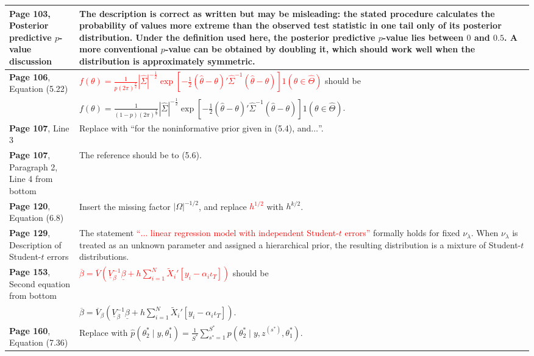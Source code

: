 \documentclass[10pt, a4paper]{article}
\newcommand{\red}[1]{\textcolor{red}{#1}}
\newcommand{\green}[1]{\textcolor{green!50!black}{#1}}
\begin{document}
\begin{longtable}{|R{.36\textwidth}|R{.58\textwidth}|}
	\textbf{Page 103}, Posterior predictive $p$-value discussion & The description is correct as written but may be misleading: the stated procedure calculates the probability of values more extreme than the observed test statistic in one tail only of its posterior distribution. Under the definition used here, the posterior predictive $p$-value lies between $0$ and $0.5$. A more conventional $p$-value can be obtained by doubling it, which should work well when the distribution is approximately symmetric. \\ \hline	
	\textbf{Page 106}, Equation (5.22) & \red{$\displaystyle f(\theta)=\frac{1}{p(2\pi)^{\frac{k}{2}}}|\widehat{\Sigma}|^{-\frac{1}{2}}\exp\left[-\frac{1}{2}(\widehat{\theta}-\theta)'\widehat{\Sigma}^{-1}(\widehat{\theta}-\theta)\right]1(\theta\in\widehat{\Theta})$} should be \\ 
	& \green{$\displaystyle f(\theta)=\frac{1}{(1-p)(2\pi)^{\frac{k}{2}}}|\widehat{\Sigma}|^{-\frac{1}{2}}\exp\left[-\frac{1}{2}(\widehat{\theta}-\theta)'\widehat{\Sigma}^{-1}(\widehat{\theta}-\theta)\right]1(\theta\in\widehat{\Theta})$}. \\ \hline	
	\textbf{Page 107}, Line 3 & Replace with \green{``for the noninformative prior given in (5.4), and$\ldots$''}. \\ \hline	
	\textbf{Page 107}, Paragraph 2, Line 4 from bottom & The reference should be to \green{(5.6)}. \\ \hline	
	\textbf{Page 120}, Equation (6.8) & Insert the missing factor \green{$|\Omega|^{-1/2}$}, and replace \red{$h^{1/2}$} with \green{$h^{k/2}$}. \\ \hline	
	\textbf{Page 129}, Description of Student-$t$ errors & The statement \red{``$\ldots$ linear regression model with independent Student-$t$ errors''} formally holds for fixed $\nu_\lambda$. When $\nu_\lambda$ is treated as an unknown parameter and assigned a hierarchical prior, the resulting distribution is a mixture of Student-$t$ distributions. \\ \hline	
	\textbf{Page 153}, Second equation from bottom &  \red{$\displaystyle \overline{\beta}=\overline{V} \left(\underline{V}_{\beta}^{-1}\underline{\beta}+h\sum_{i=1}^{N}\widetilde{X}_i'[y_i-\alpha_i\iota_T]\right)$} should be \\
	& \green{$\displaystyle \overline{\beta}=\overline{V}_{\beta}\left(\underline{V}_{\beta}^{-1}\underline{\beta}+h\sum_{i=1}^{N}\widetilde{X}_i'[y_i-\alpha_i\iota_T]\right)$}. \\ \hline	
	\textbf{Page 160}, Equation (7.36) & Replace with \green{$\displaystyle \widehat{p}(\theta_2^*\mid y,\theta_1^*)=\frac{1}{S^*}\sum_{s^*=1}^{S^*}p\!\left(\theta_2^*\mid y,z^{(s^*)},\theta_1^*\right)$}. \\ \hline

\end{longtable}
\end{document}
